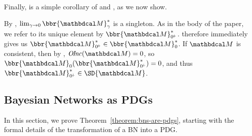 \begin{subappendices}
Finally,  is a simple corollary of  and , as we now show. 
\begin{lproof}\label{proof:consist}
By , $\lim_{\gamma \to 0}\bbr{\dg M}_\gamma^*$
is a singleton. As in the body of the paper, we refer to its unique element by $\bbr{\dg M}^*_{0^{\!+}}$.
 therefore immediately gives us $\bbr{\dg M}^*_{0^{\!+}} \in \bbr{\dg M}_0^*$.  
%
If $\dg M$ is consistent, then by ,
$\OInc({\dg M}) = 0$, so $\bbr{\dg M}_0(\bbr{\dg M}^*_{0^{\!+}}) = 0$, and thus
$\bbr{\dg M}^*_{0^{\!+}} 
\in \SD{\dg M}$. 
\end{lproof}


\subsection{Bayesian Networks as PDGs}
In this section, we prove Theorem~\ref{theorem:bns-are-pdgs},
%
% 
%
starting with the formal details of
the transformation of a BN into a PDG.


\end{subappendices}
